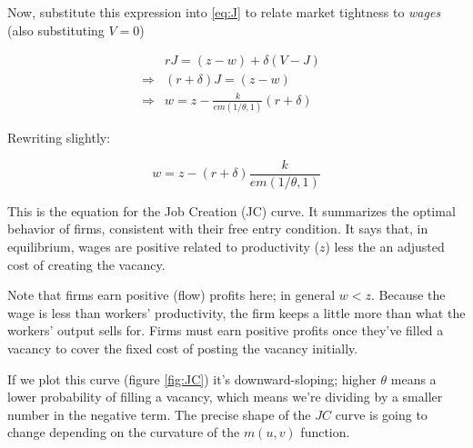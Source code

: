 \documentclass[12pt]{article}
\begin{document}
Now, substitute this expression into \eqref{eq:J} to relate market tightness to \textit{wages} (also substituting $V = 0$)

\begin{equation*}
	\begin{aligned}
			&	r J = (z - w) + \delta (V - J) &\\
			\Rightarrow& (r+\delta) J = (z-w) &\\
			\Rightarrow &w = z - \frac{k}{em(1/\theta,1)} (r + \delta)
	\end{aligned}
\end{equation*}

Rewriting slightly:

\begin{equation}\label{eq:JC}
		w = z - (r + \delta) \frac{k}{em(1/\theta,1)} \tag{JC}
\end{equation}

This is the equation for the Job Creation (JC) curve.  It summarizes the optimal behavior of firms, consistent with their free entry condition.  It says that, in equilibrium, wages are positive related to productivity ($z$) less the an adjusted cost of creating the vacancy.

Note that firms earn positive (flow) profits here; in general $w < z$.  Because the wage is less than workers' productivity, the firm keeps a little more than what the workers' output sells for.  Firms must earn positive profits once they've filled a vacancy to cover the fixed cost of posting the vacancy initially.  

If we plot this curve (figure \ref{fig:JC}) it's downward-sloping; higher $\theta$ means a lower probability of filling a vacancy, which means we're dividing by a smaller number in the negative term.  The precise shape of the $JC$ curve is going to change depending on the curvature of the $m(u,v)$ function. 
\end{document}
